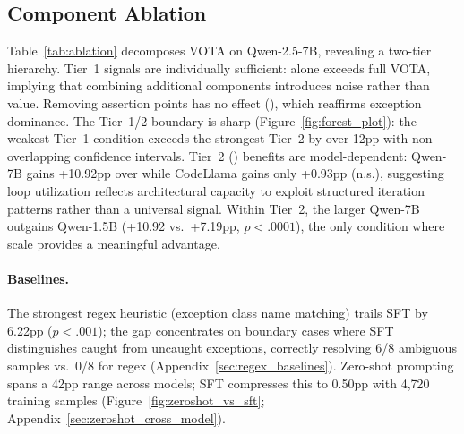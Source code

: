 \subsection{Component Ablation}
\label{sec:ablation}

Table~\ref{tab:ablation} decomposes VOTA on Qwen-2.5-7B, revealing a two-tier hierarchy.
Tier~1 signals are individually sufficient:  alone exceeds full VOTA, implying that combining additional components introduces noise rather than value.
Removing assertion points has no effect (), which reaffirms exception dominance.
The Tier~1/2 boundary is sharp (Figure~\ref{fig:forest_plot}): the weakest Tier~1 condition exceeds the strongest Tier~2 by over 12pp with non-overlapping confidence intervals.
Tier~2 () benefits are model-dependent: Qwen-7B gains +10.92pp over  while CodeLlama gains only +0.93pp (n.s.), suggesting loop utilization reflects architectural capacity to exploit structured iteration patterns rather than a universal signal.
Within Tier~2, the larger Qwen-7B outgains Qwen-1.5B (+10.92 vs.\ +7.19pp, $p{<}.0001$), the only condition where scale provides a meaningful advantage.

\paragraph{Baselines.}
The strongest regex heuristic (exception class name matching) trails SFT  by 6.22pp ($p{<}.001$); the gap concentrates on boundary cases where SFT distinguishes caught from uncaught exceptions, correctly resolving 6/8 ambiguous samples vs.\ 0/8 for regex (Appendix~\ref{sec:regex_baselines}).
Zero-shot prompting spans a 42pp range across models; SFT compresses this to 0.50pp with 4,720 training samples (Figure~\ref{fig:zeroshot_vs_sft}; Appendix~\ref{sec:zeroshot_cross_model}).

\begin{table}[t]
\centering
\caption{Information density decomposition on Qwen-7B. Gradient masking () bounds backward-pass dilution; the remaining gap reflects inference-time input factors. 3-seed means.}
\label{tab:density}
\small
{}
\end{table}

